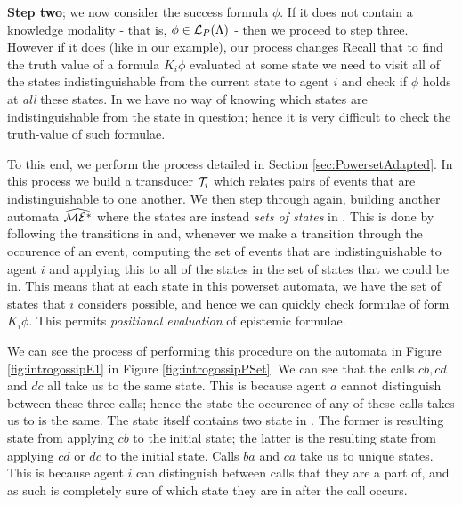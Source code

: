 \documentclass[10pt, a4paper]{report}
\begin{document}
\textbf{Step two}; we now consider the success formula $\phi$. If it does not
contain a knowledge modality - that is, $\phi \in \mathcal{L}_P(\Lambda)$ - then we
proceed to step three. However if it does (like in our example), our process
changes Recall that to find the truth value of a formula $K_i \phi$ evaluated at
some state we need to visit all of the states indistinguishable from the current
state to agent $i$ and check if $\phi$ holds at \emph{all} these states. In
\mestar we have no way of knowing which states are indistinguishable from the
state in question; hence it is very difficult to check the truth-value of such
formulae.

To this end, we perform the process detailed in Section
\ref{sec:PowersetAdapted}. In this process we build a transducer $\mathcal{T}_i$
which relates pairs of events that are indistinguishable to one another. We then
step through \mestar again, building another automata $\widehat{\mathcal{ME^\ast}}$ where
the states are instead \emph{sets of states} in \mestar. This is done by
following the transitions in \mestar and, whenever we make a transition through
the occurence of an event, computing the set of events that are
indistinguishable to agent $i$ and applying this to all of the states in the set
of states that we could be in. This means that at each state in this powerset
automata, we have the set of states that $i$ considers possible, and hence we
can quickly check formulae of form $K_i \phi$. This permits \emph{positional
  evaluation} of epistemic formulae.

We can see the process of performing this procedure on the automata in Figure
\ref{fig:introgossipE1} in Figure \ref{fig:introgossipPSet}. We can see that the
calls $cb, cd$ and $dc$ all take us to the same state. This is because agent $a$
cannot distinguish between these three calls; hence the state the occurence of
any of these calls takes us to is the same. The state itself contains two state
in \mestar. The former is resulting state from applying $cb$ to the initial
state; the latter is the resulting state from applying $cd$ or $dc$ to the
initial state. Calls $ba$ and $ca$ take us to unique states. This is because
agent $i$ can distinguish between calls that they are a part of, and as such is
completely sure of which state they are in after the call occurs. 
\end{document}
